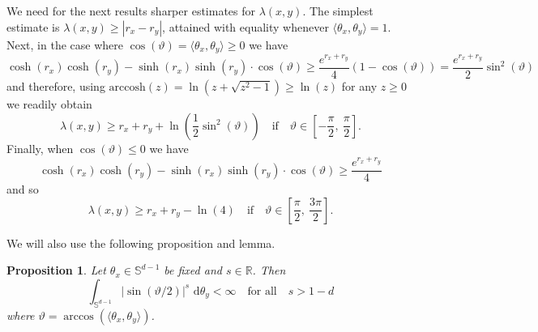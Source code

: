 \documentclass[12pt,longbibliography]{article}
\def\R{\mathbb{R}}
\def\S{\mathbb{S}}
\def\d{\,\mathrm{d}}
\def\R{\mathbb{R}}
\def\d{\,\mathrm{d}}
\newtheorem{prp}[thm]{Proposition}
\theoremstyle{definition}
\theoremstyle{remark}
\theoremstyle{example}
\begin{document}
We need for the next results sharper estimates for $\lambda(x,y)$. The simplest estimate is $\lambda(x,y)\geq |r_x-r_y|$, attained with equality whenever $\langle\theta_x,\theta_y\rangle = 1$. Next, in the case where $\cos(\vartheta) = \langle\theta_x,\theta_y\rangle \geq 0$ we have
\[
\cosh(r_x)\cosh(r_y)-\sinh(r_x)\sinh(r_y)\cdot \cos(\vartheta) \geq \frac{e^{r_x+r_y}}{4}(1-\cos(\vartheta)) = \frac{e^{r_x+r_y}}{2}\sin^2(\vartheta)
\]
and therefore, using $\text{arccosh}(z)=\ln(z+\sqrt{z^2-1})\geq \ln(z)$ for any $z\geq 0$ we readily obtain
\begin{equation}\label{eq:inferior_bound_lambda_positive_cosine}
	\lambda(x,y)\geq r_x+r_y+\ln\left(\frac{1}{2}\sin^2(\vartheta)\right)\quad\text{if}\quad \vartheta\in \left[-\frac{\pi}{2},\ \frac{\pi}{2}\right].
\end{equation}
Finally, when $\cos(\vartheta) \leq 0$ we have
\[
\cosh(r_x)\cosh(r_y)-\sinh(r_x)\sinh(r_y)\cdot \cos(\vartheta) \geq \frac{e^{r_x+r_y}}{4}
\]
and so
\begin{equation}\label{eq:inferior_bound_lambda_negative_cosine}
	\lambda(x,y)\geq r_x+r_y-\ln\left(4\right)\quad\text{if}\quad \vartheta\in \left[\frac{\pi}{2},\ \frac{3\pi}{2}\right].
\end{equation}

We will also use the following proposition and lemma.
\begin{prp}\label{prp:integral_in_the_sphere_negative_sine}
	Let $\theta_x\in\S^{d-1}$ be fixed and $s\in\R$. Then
	\[
	\int_{\S^{d-1}}|\sin(\vartheta/2)|^s\, \d \theta_y<\infty\quad\text{for all}\quad s>1-d
	\]
	where $\vartheta=\arccos(\langle\theta_x, \theta_y\rangle)$.
\end{prp}
\end{document}

